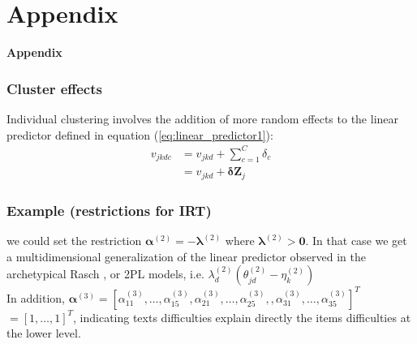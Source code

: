 \documentclass[arial,12pt,xcolor=dvipsnames]{beamer}
\begin{document}
\section*{Appendix}
%
\begin{frame}
	\textbf{Appendix}
\end{frame}
%
\begin{frame}
	\frametitle{Cluster effects}
	Individual clustering involves the addition of more random effects to the linear predictor defined in equation (\ref{eq:linear_predictor1}):
	\begin{equation} \label{eq:linear_predictor4}
		\begin{split}
			v_{jkdc} &= v_{jkd} + \sum_{c=1}^{C} \delta_{c}  \\
			&= v_{jkd} + \pmb{\delta} \mathbf{Z}_{j}
		\end{split}
	\end{equation}
\end{frame}
%
\begin{frame}
	\frametitle{Example (restrictions for IRT)}
	we could set the restriction $\pmb{\alpha}^{(2)} = -\pmb{\lambda}^{(2)}$ where $\pmb{\lambda}^{(2)} > \mathbf{0}$. In that case we get a multidimensional generalization of the linear predictor observed in the archetypical Rasch \cite{Rasch_1980}, or 2PL \cite{Lord_et_al_2008} models, i.e. $ \lambda^{(2)}_{d} (\theta^{(2)}_{jd} - \eta^{(2)}_{k} )$ \\
	\vspace{0.3cm} In addition, $\pmb{\alpha}^{(3)} = [ \alpha_{11}^{(3)}, \dots, \alpha_{15}^{(3)}, \alpha_{21}^{(3)}, \dots, \alpha_{25}^{(3)}, , \alpha_{31}^{(3)}, \dots, \alpha_{35}^{(3)} ]^{T}$ $= [1,\dots,1]^{T}$, indicating texts difficulties explain directly the items difficulties at the lower level.
\end{frame}
%
\end{document}

